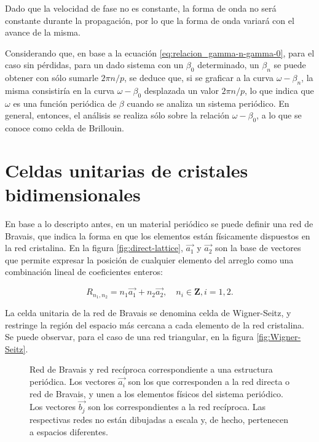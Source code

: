 Dado que la velocidad de fase no es constante, la forma de onda no será constante durante la propagación, por lo que la forma de onda variará con el avance de la misma.

Considerando que, en base a la ecuación \ref{eq:relacion_gamma-n-gamma-0}, para el caso sin pérdidas, para un dado sistema con un $\beta_0$ determinado, un $\beta_n$ se puede obtener con sólo sumarle $2\pi n/p$, se deduce que, si se graficar a la curva $\omega-\beta_n$, la misma consistiría en la curva $\omega-\beta_0$ desplazada un valor $2\pi n /p$, lo que indica que $\omega$ es una función periódica de $\beta$ cuando se analiza un sistema periódico. En general, entonces, el análisis se realiza sólo sobre la relación $\omega-\beta_0$, a lo que se conoce como celda de Brillouin.

\section{Celdas unitarias de cristales bidimensionales}
\label{sec:celdas-unitarias}

En base a lo descripto antes, en un material periódico se puede definir una red de Bravais, que indica la forma en que los elementos están físicamente dispuestos en la red cristalina. En la figura \ref{fig:direct-lattice}, $\vec{a_1}$ y $\vec{a_2}$ son la base de vectores que permite expresar la posición de cualquier elemento del arreglo como una combinación lineal de coeficientes enteros:

\begin{equation}
R_{n_1,n_2} = n_1 \vec{a_1} + n_2 \vec{a_2}, \quad n_i \in \textbf{Z}, i={1,2}.
\end{equation}

La celda unitaria de la red de Bravais se denomina celda de Wigner-Seitz, y restringe la región del espacio más cercana a cada elemento de la red cristalina. Se puede observar, para el caso de una red triangular, en la figura \ref{fig:Wigner-Seitz}.

\begin{figure}[H]
	\centering 
	\hspace{0pt}
	\caption{Red de Bravais y red recíproca correspondiente a una estructura periódica. Los vectores $\vec{a_i}$ son los que corresponden a la red directa o red de Bravais, y unen a los elementos físicos del sistema periódico. Los vectores $\vec{b_j}$ son los correspondientes a la red recíproca. Las respectivas redes no están dibujadas a escala y, de hecho, pertenecen a espacios diferentes.}
	\label{fig:direct-and-reciprocal-lattice}
\end{figure}

